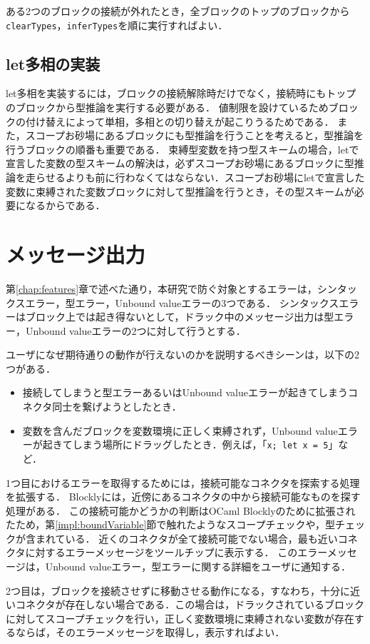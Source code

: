 ある2つのブロックの接続が外れたとき，全ブロックのトップのブロックから{\tt clearTypes}，{\tt inferTypes}を順に実行すればよい．

\subsection*{let多相の実装} %
let多相を実装するには，ブロックの接続解除時だけでなく，接続時にもトップのブロックから型推論を実行する必要がある．
値制限を設けているためブロックの付け替えによって単相，多相との切り替えが起こりうるためである．
また，スコープお砂場にあるブロックにも型推論を行うことを考えると，型推論を行うブロックの順番も重要である．
束縛型変数を持つ型スキームの場合，letで宣言した変数の型スキームの解決は，必ずスコープお砂場にあるブロックに型推論を走らせるよりも前に行わなくてはならない．スコープお砂場にletで宣言した変数に束縛された変数ブロックに対して型推論を行うとき，その型スキームが必要になるからである．

\section {メッセージ出力}

第\ref{chap:features}章で述べた通り，本研究で防ぐ対象とするエラーは，シンタックスエラー，型エラー，Unbound valueエラーの3つである．
シンタックスエラーはブロック上では起き得ないとして，ドラック中のメッセージ出力は型エラー，Unbound valueエラーの2つに対して行うとする．

ユーザになぜ期待通りの動作が行えないのかを説明するべきシーンは，以下の2つがある．
\begin {itemize}
  \item 接続してしまうと型エラーあるいはUnbound valueエラーが起きてしまうコネクタ同士を繋げようとしたとき．
  \item 変数を含んだブロックを変数環境に正しく束縛されず，Unbound valueエラーが起きてしまう場所にドラッグしたとき．例えば，「{\tt x; let x = 5}」など．
\end {itemize}

1つ目におけるエラーを取得するためには，接続可能なコネクタを探索する処理を拡張する．
Blocklyには，近傍にあるコネクタの中から接続可能なものを探す処理がある．
この接続可能かどうかの判断はOCaml Blocklyのために拡張されたため，第\ref{impl:boundVariable}節で触れたようなスコープチェックや，型チェックが含まれている．
近くのコネクタが全て接続可能でない場合，最も近いコネクタに対するエラーメッセージをツールチップに表示する．
このエラーメッセージは，Unbound valueエラー，型エラーに関する詳細をユーザに通知する．

2つ目は，ブロックを接続させずに移動させる動作になる，すなわち，十分に近いコネクタが存在しない場合である．この場合は，ドラックされているブロックに対してスコープチェックを行い，正しく変数環境に束縛されない変数が存在するならば，そのエラーメッセージを取得し，表示すればよい．


